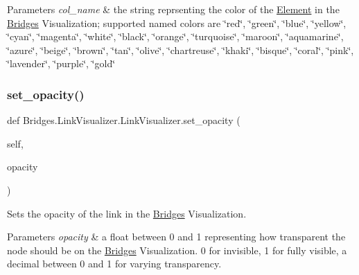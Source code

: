 \begin{DoxyParams}{Parameters}
{\em col\+\_\+name} & the string reprsenting the color of the \mbox{\hyperlink{namespace_bridges_1_1_element}{Element}} in the \mbox{\hyperlink{namespace_bridges_1_1_bridges}{Bridges}} Visualization; supported named colors are \char`\"{}red\char`\"{}, \char`\"{}green\char`\"{}, \char`\"{}blue\char`\"{}, \char`\"{}yellow\char`\"{}, \char`\"{}cyan\char`\"{}, \char`\"{}magenta\char`\"{}, \char`\"{}white\char`\"{}, \char`\"{}black\char`\"{}, \char`\"{}orange\char`\"{}, \char`\"{}turquoise\char`\"{}, \char`\"{}maroon\char`\"{}, \char`\"{}aquamarine\char`\"{}, \char`\"{}azure\char`\"{}, \char`\"{}beige\char`\"{}, \char`\"{}brown\char`\"{}, \char`\"{}tan\char`\"{}, \char`\"{}olive\char`\"{}, \char`\"{}chartreuse\char`\"{}, \char`\"{}khaki\char`\"{}, \char`\"{}bisque\char`\"{}, \char`\"{}coral\char`\"{}, \char`\"{}pink\char`\"{}, \char`\"{}lavender\char`\"{}, \char`\"{}purple\char`\"{}, \char`\"{}gold\char`\"{} \\
\hline
\end{DoxyParams}
\mbox{\label{class_bridges_1_1_link_visualizer_1_1_link_visualizer_a44411f855d60c20b267f1178add887bb}} 
\subsubsection{\texorpdfstring{set\+\_\+opacity()}{set\_opacity()}}
{\footnotesize\ttfamily def Bridges.\+Link\+Visualizer.\+Link\+Visualizer.\+set\+\_\+opacity (\begin{DoxyParamCaption}\item[{}]{self,  }\item[{}]{opacity }\end{DoxyParamCaption})}



Sets the opacity of the link in the \mbox{\hyperlink{namespace_bridges_1_1_bridges}{Bridges}} Visualization. 


\begin{DoxyParams}{Parameters}
{\em opacity} & a float between 0 and 1 representing how transparent the node should be on the \mbox{\hyperlink{namespace_bridges_1_1_bridges}{Bridges}} Visualization. 0 for invisible, 1 for fully visible, a decimal between 0 and 1 for varying transparency. \\
\hline
\end{DoxyParams}
\mbox{\label{class_bridges_1_1_link_visualizer_1_1_link_visualizer_a8324c9809412fb0a4994ad8bae1c7166}} 
